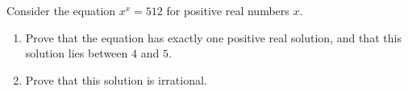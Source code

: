 Consider the equation $x^x=512$ for positive real numbers $x$.
\begin{enumerate}
\item[(a)] Prove that the equation has exactly one positive real solution, and that this solution lies between $4$ and $5$.
\item[(b)] Prove that this solution is irrational.
\end{enumerate}
